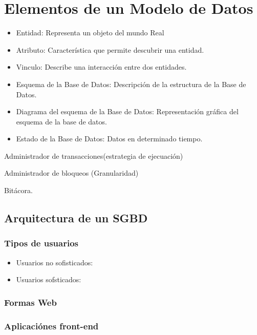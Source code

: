 \documentclass[12pt, fleqn]{report}                             %
\theoremstyle{break}                                            %
\begin{document}
\section{Elementos de un Modelo de Datos}
\begin{itemize}
	\item Entidad: Representa un objeto del mundo Real
	\item Atributo: Característica que permite descubrir una entidad.
	\item Vinculo: Describe una interacción entre dos entidades.
	\item Esquema de la Base de Datos: Descripción de la estructura de la Base de Datos.
	\item Diagrama del esquema de la Base de Datos: Representación gráfica del esquema de la base de datos.
	\item Estado de la Base de Datos: Datos en determinado tiempo.
\end{itemize}





    Administrador de transacciones(estrategia de ejecuación)

    Administrador de bloqueos (Granularidad)

    Bitácora.






    \subsection{Arquitectura de un SGBD}

		\subsubsection{Tipos de usuarios}
		\begin{itemize}
			\item Usuarios no sofisticados: 
			\item Usuarios sofsticados:
		\end{itemize}
		\subsubsection{Formas Web}
		\subsubsection{Aplicaciónes front-end}
\end{document}
